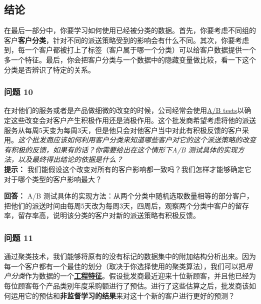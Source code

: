 \documentclass[11pt]{article}
\begin{document}
    \hypertarget{ux7ed3ux8bba}{%
\subsection{结论}\label{ux7ed3ux8bba}}

在最后一部分中，你要学习如何使用已经被分类的数据。首先，你要考虑不同组的客户\textbf{客户分类}，针对不同的派送策略受到的影响会有什么不同。其次，你要考虑到，每一个客户都被打上了标签（客户属于哪一个分类）可以给客户数据提供一个多一个特征。最后，你会把客户分类与一个数据中的隐藏变量做比较，看一下这个分类是否辨识了特定的关系。

    \hypertarget{ux95eeux9898-10}{%
\subsubsection{问题 10}\label{ux95eeux9898-10}}

在对他们的服务或者是产品做细微的改变的时候，公司经常会使用\href{https://en.wikipedia.org/wiki/A/B_testing}{A/B
tests}以确定这些改变会对客户产生积极作用还是消极作用。这个批发商希望考虑将他的派送服务从每周5天变为每周3天，但是他只会对他客户当中对此有积极反馈的客户采用。\emph{这个批发商应该如何利用客户分类来知道哪些客户对它的这个派送策略的改变有积极的反馈，如果有的话？你需要给出在这个情形下A/B
测试具体的实现方法，以及最终得出结论的依据是什么？}\\
\textbf{提示：}
我们能假设这个改变对所有的客户影响都一致吗？我们怎样才能够确定它对于哪个类型的客户影响最大？

    \textbf{回答：} A/B
测试具体的实现方法：从两个分类中随机选取数量相等的部分客户，把他们的派送时间由每周5天改为每周3天，四周后，观察两个分类中客户的留存率，留存率高，说明该分类的客户对新的派送策略有积极反馈。

    \hypertarget{ux95eeux9898-11}{%
\subsubsection{问题 11}\label{ux95eeux9898-11}}

通过聚类技术，我们能够将原有的没有标记的数据集中的附加结构分析出来。因为每一个客户都有一个最佳的划分（取决于你选择使用的聚类算法），我们可以把\emph{用户分类}作为数据的一个\href{https://en.wikipedia.org/wiki/Feature_learning\#Unsupervised_feature_learning}{\textbf{工程特征}}。假设批发商最近迎来十位新顾客，并且他已经为每位顾客每个产品类别年度采购额进行了预估。进行了这些估算之后，批发商该如何运用它的预估和\textbf{非监督学习的结果}来对这十个新的客户进行更好的预测？
\end{document}
